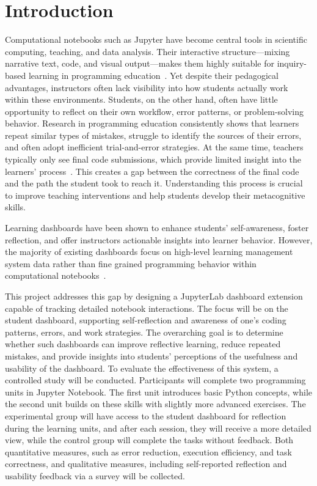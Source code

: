 \section{Introduction}
Computational notebooks such as Jupyter have become central tools in scientific computing, teaching, and data analysis. Their interactive structure—mixing narrative text, code, and visual output—makes them highly suitable for inquiry-based learning in programming education~\cite{perkel2018jupyter}. Yet despite their pedagogical advantages, instructors often lack visibility into how students actually work within these environments. Students, on the other hand, often have little opportunity to reflect on their own workflow, error patterns, or problem-solving behavior. Research in programming education consistently shows that learners repeat similar types of mistakes, struggle to identify the sources of their errors, and often adopt inefficient trial-and-error strategies. At the same time, teachers typically only see final code submissions, which provide limited insight into the learners' process~\cite{robinson2022error}. This creates a gap between the correctness of the final code and the path the student took to reach it. Understanding this process is crucial to improve teaching interventions and help students develop their metacognitive skills.

Learning dashboards have been shown to enhance students' self-awareness, foster reflection, and offer instructors actionable insights into learner behavior. However, the majority of existing dashboards focus on high-level learning management system data rather than fine grained programming behavior within computational notebooks~\cite{paulsen2024learning}. 

This project addresses this gap by designing a JupyterLab dashboard extension capable of tracking detailed notebook interactions. The focus will be on the student dashboard, supporting self-reflection and awareness of one's coding patterns, errors, and work strategies. The overarching goal is to determine whether such dashboards can improve reflective learning, reduce repeated mistakes, and provide insights into students' perceptions of the usefulness and usability of the dashboard. To evaluate the effectiveness of this system, a controlled study will be conducted. Participants will complete two programming units in Jupyter Notebook. The first unit introduces basic Python concepts, while the second unit builds on these skills with slightly more advanced exercises. The experimental group will have access to the student dashboard for reflection during the learning units, and after each session, they will receive a more detailed view, while the control group will complete the tasks without feedback. Both quantitative measures, such as error reduction, execution efficiency, and task correctness, and qualitative measures, including self-reported reflection and usability feedback via a survey will be collected.


